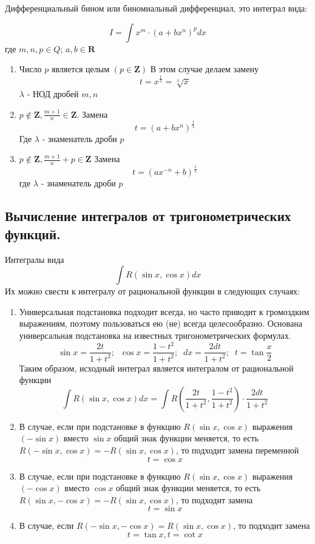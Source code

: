 \documentclass[a4paper,12pt]{article}
\theoremstyle{plain} %
\theoremstyle{definition} %
\theoremstyle{remark} %
\begin{document}
Дифференциальный бином или биномиальный дифференциал, это интеграл вида:

\[
	I = \int x^m \cdot (a + bx^n)^p dx
\]
где $m,n,p \in Q$; $a, b \in \mathbf{R}$

\begin{enumerate}
	\item Число $p$ является целым $(p \in \mathbf{Z})$
	      В этом случае делаем замену \[ t = x^{\frac{1}{\lambda}} = \sqrt[\lambda]{x} \]
	      $\lambda$ - НОД дробей $m, n$
	\item $p \notin \mathbf{Z}, \frac{m+1}{n} \in \mathbf{Z}$. Замена \[ t = (a + bx^n)^{\frac{1}{\lambda}} \]
	      Где $\lambda$ - знаменатель дроби $p$
	\item $p \notin \mathbf{Z}, \frac{m+1}{n} + p \in \mathbf{Z} $
	      Замена
	      \[ t = (ax^{-n} + b)^{\frac{1}{\lambda}} \]
	      где $\lambda$ - знаменатель дроби $p$
\end{enumerate}



\newpage
\subsection*{Вычисление интегралов от тригонометрических функций.                                         }

Интегралы вида
\[ \int R (\sin x, \cos x)dx \]
Их можно свести к интегралу от рациональной функции в следующих случаях:

\begin{enumerate}
	\item Универсальная подстановка подходит всегда, но часто приводит к громоздким выражениям, поэтому пользоваться ею (не) всегда целесообразно. Основана универсальная подстановка на известных тригонометрических формулах.
	      \[ \sin x = \frac{2t}{1 + t^2}; \; \; \cos x = \frac{1 - t^2}{1 + t^2}; \; \; dx = \frac{2dt}{1 + t^2}; \; \; t = \tan \frac{x}{2} \]
	      Таким образом, исходный интеграл является интегралом от рациональной функции
	      \[ \int R(\sin x, \cos x)dx = \int R \left( \frac{2t}{1 + t^2}, \frac{1 - t^2}{1 + t^2} \right) \cdot \frac{2dt}{1 + t^2} \]
	\item В случае, если при подстановке в функцию $R(\sin x, \cos x)$ выражения $(-\sin x)$ вместо $\sin x$ общий знак функции меняется, то есть $R(- \sin x, \cos x) = - R(\sin x, \cos x)$, то подходит замена переменной \[t = \cos x\]
	\item В случае, если при подстановке в функцию $R(\sin x, \cos x)$ выражения $(-\cos x)$ вместо $\cos x$ общий знак функции меняется, то есть $R(\sin x, - \cos x) = -R (\sin x, \cos x)$, то подходит замена \[ t= \sin x \]
	\item В случае, если $R(- \sin x, - \cos x) = R(\sin x, \cos x)$, то подходит замена \[ t = \tan x, t = \cot x \]
\end{enumerate}
\end{document}
